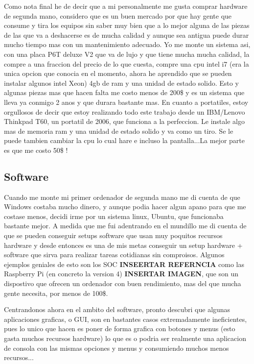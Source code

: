 Como nota final he de decir que a mi personalmente me gusta comprar hardware de segunda mano, considero que es un buen mercado por que hay gente que consume y tira los equipos sin saber muy bien que a lo mejor alguna de las piezas de las que va a deshacerse es de mucha calidad y aunque sea antigua puede durar mucho tiempo mas con un mantenimiento adecuado. Yo me monte un sistema asi, con una placa P6T deluxe V2 que va de lujo y que tiene mucha mucha calidad, la compre a una fraccion del precio de lo que cuesta, compre una cpu intel i7 (era la unica opcion que conocia en el momento, ahora he aprendido que se pueden instalar algunos intel Xeon) 4gb de ram y una unidad de estado solido. Esto y algunas piezas mas que hacen falta me costo menos de 200\$ y es un sistema que lleva ya conmigo 2 anos y que durara bastante mas. En cuanto a portatiles, estoy orgullosos de decir que estoy realizando todo este trabajo desde un IBM/Lenovo Thinkpad T60, un portatil de 2006, que funciona a la perfeccion. Le instale algo mas de memoria ram y una unidad de estado solido y va como un tiro. Se le puede tambien cambiar la cpu lo cual hare e incluso la pantalla...La mejor parte es que me costo 50\$ !

\subsection{ Software }

Cuando me monte mi primer ordenador de segunda mano me di cuenta de que Windows costaba mucho dinero, y aunque podia hacer algun apano para que me costase menos, decidi irme por un sistema linux, Ubuntu, que funcionaba bastante mejor. A medida que me fui adentrando en el mundillo me di cuenta de que se pueden conseguir setups software que usan muy poquitos recursos hardware y desde entonces es una de mis metas conseguir un setup hardware + software que sirva para realizar tareas cotidianas sin comproisos. Algunos ejemplos geniales de esto son los SOC \textbf{INSEERTAR REFERNCIA} como las Raspberry Pi (en concreto la version 4) \textbf{INSERTAR IMAGEN}, que son un dispostivo que ofrecen un ordenador con buen rendimiento, mas del que mucha gente necesita, por menos de 100\$.

Centrandonos ahora en el ambito del software, pronto descubri que algunas aplicaciones graficas, o GUI, son en bastantes casos extremadamente ineficientes, pues lo unico que hacen es poner de forma grafica con botones y menus (esto gasta muchos recursos hardware) lo que es o podria ser realmente una aplicacion de consola con las mismas opciones y menus y consumiendo muchos menos recursos...

